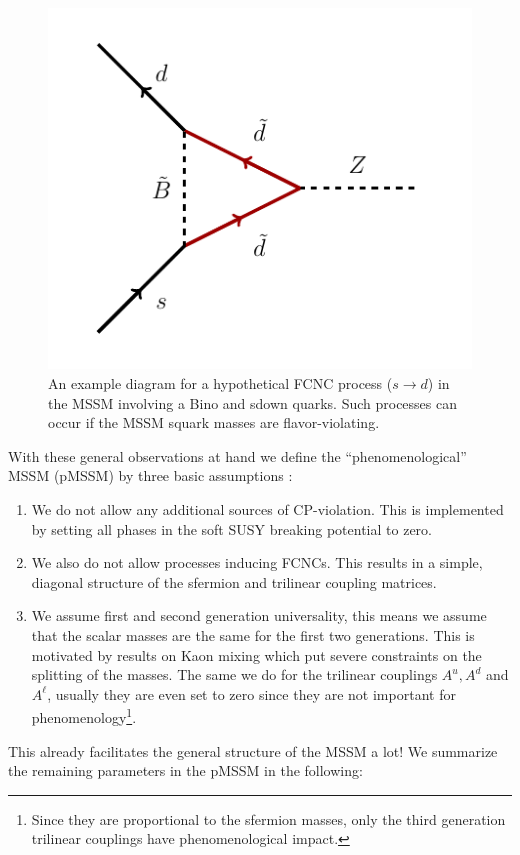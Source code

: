 \begin{figure}[t]
\centering
\includegraphics[scale = 0.8]{figures/fcnc_diagram}
\caption{An example diagram for a hypothetical FCNC process ($s \rightarrow d$) in the MSSM involving a Bino and sdown quarks. Such processes can occur if the MSSM squark masses are flavor-violating.}
\label{fig:fcnc}
\end{figure}

\noindent With these general observations at hand we define the \enquote{phenomenological} MSSM (pMSSM) by three basic assumptions \cite{MSSMGroup1998}:

\begin{enumerate}
	\item We do not allow any additional sources of CP-violation. This is implemented by setting all phases in the soft SUSY breaking potential to zero.
	\item We also do not allow processes inducing FCNCs.  This results in a simple, diagonal structure of the sfermion and trilinear coupling matrices.
	\item We assume first and second generation universality, this means we assume that the scalar masses are the same for the first two generations. This is motivated by results on Kaon mixing which put severe constraints on the splitting of the masses. The same we do for the trilinear couplings $A^{u}, A^{d}$ and $A^{\ell}$, usually they are even set to zero since they are not important for phenomenology\footnote{Since they are proportional to the sfermion masses, only the third generation trilinear couplings have phenomenological impact.}.
\end{enumerate}
This already facilitates the general structure of the MSSM a lot! \newpage We summarize the remaining parameters in the pMSSM in the following: 

